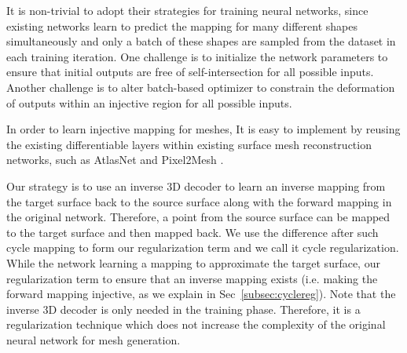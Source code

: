 
It is non-trivial to adopt their strategies for training neural networks, since existing networks learn to predict the mapping for many different shapes simultaneously and only a batch of these shapes are sampled from the dataset in each training iteration. One challenge is to initialize the network parameters to ensure that initial outputs are free of self-intersection for all possible inputs. Another challenge is to alter batch-based optimizer to constrain the deformation of outputs within an injective region for all possible inputs. 

In order to learn injective mapping for meshes,  It is easy to implement by reusing the existing differentiable layers within existing surface mesh reconstruction networks, such as AtlasNet \cite{atlasnet} and Pixel2Mesh \cite{pixel2mesh}.

 Our strategy is to use an inverse 3D decoder to learn an inverse mapping from  the target surface back to the source surface along with the forward mapping in the original network. Therefore, a point from the source surface can be mapped to the target surface and then mapped back. We use the difference after such cycle mapping to form our regularization term and we call it cycle regularization. While the network learning a mapping to approximate the target surface, our regularization term  to ensure that an inverse mapping exists (i.e. making the forward mapping injective, as we explain in Sec~\ref{subsec:cyclereg}).
Note that the inverse 3D decoder is only needed in the training phase. Therefore, it is a regularization technique which does not increase the complexity of the original neural network for mesh generation.

